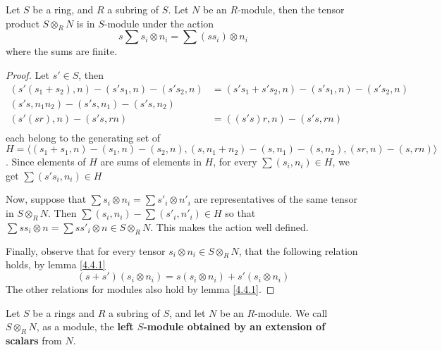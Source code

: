 \begin{theorem}\label{4.4.2}
    Let $S$ be a ring, and $R$ a subring of $S$. Let $N$ be an
    $R$-module, then the tensor product $S \otimes_R N$ is in $S$-module under
    the action
    \begin{equation*}
        s\sum{s_i \otimes n_i}=\sum{(ss_i) \otimes n_i}
    \end{equation*}
    where the sums are finite.
\end{theorem}
\begin{proof}
    Let $s' \in S$, then
    \begin{align*}
        (s'(s_1+s_2),n)-(s's_1,n)-(s's_2,n) &= (s's_1+s's_2,n)-(s's_1,n)-(s's_2,n) \\
        (s's,n_1n_2)-(s's,n_1)-(s's,n_2)    \\
        (s'(sr),n)-(s's,rn) &=  ((s's)r,n)-(s's,rn) \\
    \end{align*}
    each belong to the generating set
    of $H=\langle (s_1+s_1,n)-(s_1,n)-(s_2,n), (s,n_1+n_2)-(s,n_1)-(s,n_2),
    (sr,n)-(s,rn) \rangle$. Since elements of $H$ are sums of elements in $H$,
    for every $\sum{(s_i,n_i)} \in H$, we get $\sum{(s's_i,n_i)} \in H$

    Now, suppose that $\sum{s_i \otimes n_i}=\sum{s'_i \otimes n'_i}$ are
    representatives of the same tensor in $S \otimes_R N$. Then
    $\sum{(s_i,n_i)}-\sum{(s'_i,n'_i)} \in H$ so that $\sum{ss_i \otimes
    n}=\sum{ss'_i \otimes n} \in S \otimes_R N$. This makes the action well
    defined.

    Finally, observe that for every tensor $s_i \otimes n_i \in S \otimes_R N$,
    that the following relation holds, by lemma \ref{4.4.1}
    \begin{equation*}
        (s+s')(s_i \otimes n_i)=s(s_i \otimes n_i)+s'(s_i \otimes n_i)
    \end{equation*}
    The other relations for modules also hold by lemma \ref{4.4.1}.
\end{proof}

\begin{definition}
    Let $S$ be a rings and $R$ a subring of $S$, and let $N$ be an
    $R$-module. We call $S \otimes_R N$, as a module, the \textbf{left
    $S$-module obtained by an extension of scalars} from $N$.
\end{definition}

